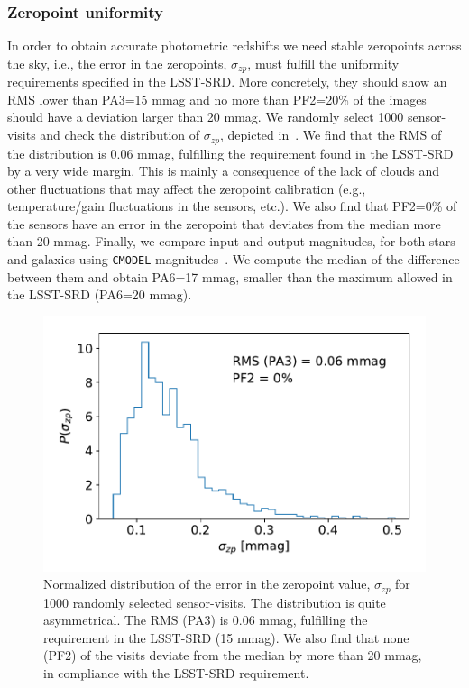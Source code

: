 \documentclass[\docopts]{\docclass}
\begin{document}
\subsubsection{Zeropoint uniformity}
\label{sssec:zeropoints}
In order to obtain accurate photometric redshifts we need stable zeropoints across the sky, i.e., the error in the zeropoints, $\sigma_{zp}$, must fulfill the uniformity requirements specified in the LSST-SRD. More concretely, they should show an RMS lower than PA3=15 mmag and no more than PF2=20\% of the images should have a deviation larger than 20 mmag. We randomly select 1000 sensor-visits and check the distribution of $\sigma_{zp}$, depicted in~. We find that the RMS of the distribution is 0.06 mmag, fulfilling the requirement found in the LSST-SRD by a very wide margin. This is mainly a consequence of the lack of clouds and other fluctuations that may affect the zeropoint calibration (e.g., temperature/gain fluctuations in the sensors, etc.). We also find that PF2=0\% of the sensors have an error in the zeropoint that deviates from the median more than 20 mmag. Finally, we compare input and output magnitudes, for both stars and galaxies using \texttt{CMODEL} magnitudes~\citep{2018PASJ...70S...5B}. We compute the median of the difference between them and obtain PA6=17 mmag, smaller than the maximum allowed in the LSST-SRD (PA6=20 mmag). 
\begin{figure}
\centering
\includegraphics[width=0.85\columnwidth]{PA234.pdf}
\caption{Normalized distribution of the error in the zeropoint value, $\sigma_{zp}$ for 1000 randomly selected sensor-visits. The distribution is quite asymmetrical. The RMS (PA3) is 0.06 mmag, fulfilling the requirement in the LSST-SRD (15 mmag). We also find that none (PF2) of the visits deviate from the median by more than 20 mmag, in compliance with the LSST-SRD requirement.}
\label{fig:PA34}
\end{figure}
\end{document}
